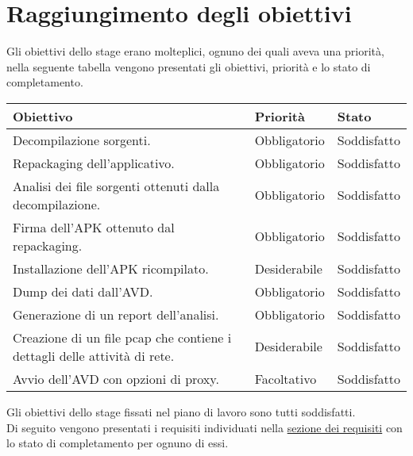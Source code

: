 

\section{Raggiungimento degli obiettivi}\label{sec:raggiungimento-degli-obiettivi}
Gli obiettivi dello stage erano molteplici, ognuno dei quali aveva una priorità, nella seguente tabella vengono presentati gli obiettivi, priorità e lo stato di completamento.

\begin{longtable}{|C{7cm}|C{3cm}|C{3cm}|}
    \hline
    \textbf{Obiettivo} &
    \textbf{Priorità} &
    \textbf{Stato} \\\hline
    Decompilazione sorgenti.
    & Obbligatorio & Soddisfatto \\\hline
    Repackaging dell'applicativo.
    & Obbligatorio & Soddisfatto \\\hline
    Analisi dei file sorgenti ottenuti dalla decompilazione.
    & Obbligatorio & Soddisfatto \\\hline
    Firma dell'APK ottenuto dal repackaging.
    & Obbligatorio & Soddisfatto \\\hline
    Installazione dell'APK ricompilato.
    & Desiderabile & Soddisfatto \\\hline
    Dump dei dati dall'AVD.
    & Obbligatorio & Soddisfatto \\\hline
    Generazione di un report dell'analisi.
    & Obbligatorio & Soddisfatto \\\hline
    Creazione di un file \gls{pcap} che contiene i dettagli delle attività di rete.
    & Desiderabile & Soddisfatto \\\hline
    Avvio dell'AVD con opzioni di proxy.
    & Facoltativo  & Soddisfatto \\\hline
\end{longtable}
Gli obiettivi dello stage fissati nel piano di lavoro sono tutti soddisfatti.\\
Di seguito vengono presentati i requisiti individuati nella  \hyperref[subsec:classificazione]{sezione dei requisiti} con lo stato di completamento per ognuno di essi.

